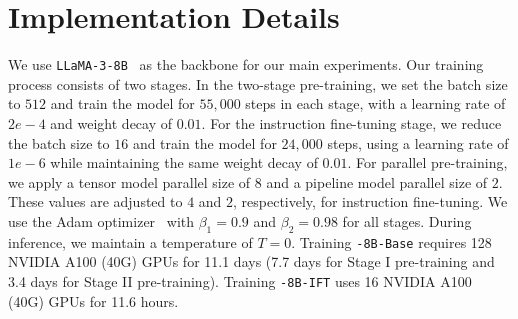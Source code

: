 \section{Implementation Details}
\label{app:implementation}

We use \texttt{LLaMA-3-8B}~\cite{dubey2024llama} as the backbone for our main experiments. Our training process consists of two stages. In the two-stage pre-training, we set the batch size to $512$ and train the model for $55,000$ steps in each stage, with a learning rate of $2e-4$ and weight decay of $0.01$. For the instruction fine-tuning stage, we reduce the batch size to $16$ and train the model for $24,000$ steps, using a learning rate of $1e-6$ while maintaining the same weight decay of $0.01$.
For parallel pre-training, we apply a tensor model parallel size of $8$ and a pipeline model parallel size of $2$. These values are adjusted to $4$ and $2$, respectively, for instruction fine-tuning. We use the Adam optimizer~\cite{kingma2014adam} with $\beta_1=0.9$ and $\beta_2=0.98$ for all stages. During inference, we maintain a temperature of $T=0$.
Training \texttt{\method-8B-Base} requires 128 NVIDIA A100 (40G) GPUs for 11.1 days (7.7 days for Stage I pre-training and 3.4 days for Stage II pre-training). Training \texttt{\method-8B-IFT} uses 16 NVIDIA A100 (40G) GPUs for 11.6 hours.


